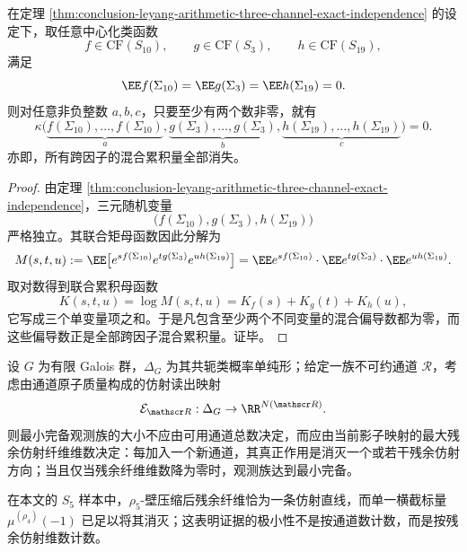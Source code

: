 \begin{theorem}[三通道跨因子混合累积量的整体湮灭]\label{thm:conclusion-leyang-three-channel-mixed-cumulants-vanish}
在定理 \ref{thm:conclusion-leyang-arithmetic-three-channel-exact-independence} 的设定下，取任意中心化类函数
\[
f\in \mathrm{CF}(S_{10}),\qquad
g\in \mathrm{CF}(S_{3}),\qquad
h\in \mathrm{CF}(S_{19}),
\]
满足
\[
\EE f(\Sigma_{10})=\EE g(\Sigma_3)=\EE h(\Sigma_{19})=0.
\]
则对任意非负整数 \(a,b,c\)，只要至少有两个数非零，就有
\[
\kappa\bigl(
\underbrace{f(\Sigma_{10}),\dots,f(\Sigma_{10})}_{a},
\underbrace{g(\Sigma_{3}),\dots,g(\Sigma_{3})}_{b},
\underbrace{h(\Sigma_{19}),\dots,h(\Sigma_{19})}_{c}
\bigr)=0.
\]
亦即，所有跨因子的混合累积量全部消失。
\end{theorem}
\begin{proof}
由定理 \ref{thm:conclusion-leyang-arithmetic-three-channel-exact-independence}，三元随机变量
\[
\bigl(f(\Sigma_{10}),g(\Sigma_3),h(\Sigma_{19})\bigr)
\]
严格独立。其联合矩母函数因此分解为
\[
M(s,t,u)
:=
\EE\bigl[e^{sf(\Sigma_{10})}e^{tg(\Sigma_3)}e^{uh(\Sigma_{19})}\bigr]
=
\EE e^{sf(\Sigma_{10})}\cdot
\EE e^{tg(\Sigma_3)}\cdot
\EE e^{uh(\Sigma_{19})}.
\]
取对数得到联合累积母函数
\[
K(s,t,u)=\log M(s,t,u)=K_f(s)+K_g(t)+K_h(u),
\]
它写成三个单变量项之和。于是凡包含至少两个不同变量的混合偏导数都为零，而这些偏导数正是全部跨因子混合累积量。证毕。
\end{proof}



\begin{conjecture}[最小完备非阿贝尔证据族由残余仿射纤维维数决定]\label{conj:conclusion-leyang-minimal-nonabelian-evidence-rank}
设 \(G\) 为有限 Galois 群，\(\Delta_G\) 为其共轭类概率单纯形；给定一族不可约通道 \(\mathscr R\)，考虑由通道原子质量构成的仿射读出映射
\[
\mathcal E_{\mathscr R}:\Delta_G\to \RR^{N(\mathscr R)}.
\]
则最小完备观测族的大小不应由可用通道总数决定，而应由当前影子映射的最大残余仿射纤维维数决定：每加入一个新通道，其真正作用是消灭一个或若干残余仿射方向；当且仅当残余纤维维数降为零时，观测族达到最小完备。

在本文的 \(S_5\) 样本中，\(\rho_5\)-壁压缩后残余纤维恰为一条仿射直线，而单一横截标量 \(\mu^{(\rho_4)}(-1)\) 已足以将其消灭；这表明证据的极小性不是按通道数计数，而是按残余仿射维数计数。
\end{conjecture}

